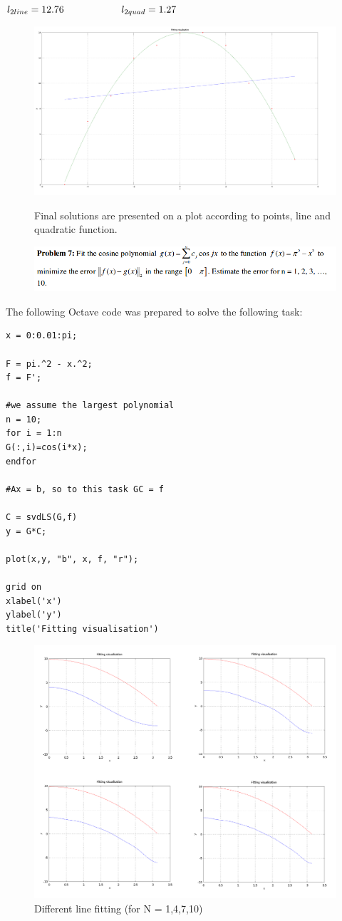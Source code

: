 \documentclass[eng,openany]{mgr}
\begin{document}
\begin{math}
l_{2line} = 12.76 \;\;\;\;\;\;\;\;\;\;\;\;\;\;\;\;\;\;\;\;\;l_{2quad} =  1.27\\
\end{math}
\begin{figure}[h]
\centering
\includegraphics[width=0.9\linewidth]{screenshot020}
\label{fig:screenshot020}
\caption{Final solutions are presented on a plot according to points, line and quadratic function.}
\end{figure}
\newpage
\begin{figure}
\centering
\includegraphics[width=0.7\linewidth]{screenshot021}
\label{fig:screenshot021}
\end{figure}
The following Octave code was prepared to solve the following task:
\begin{lstlisting}
x = 0:0.01:pi;

F = pi.^2 - x.^2;
f = F';

#we assume the largest polynomial
n = 10;
for i = 1:n
G(:,i)=cos(i*x);
endfor

#Ax = b, so to this task GC = f

C = svdLS(G,f)
y = G*C;

plot(x,y, "b", x, f, "r");

grid on
xlabel('x')
ylabel('y')
title('Fitting visualisation')
\end{lstlisting}
\begin{figure}[h]
\centering
\includegraphics[width=0.7\linewidth]{screenshot022}
\caption{Different line fitting (for N = 1,4,7,10)}
\label{fig:screenshot022}
\end{figure}
\end{document}
